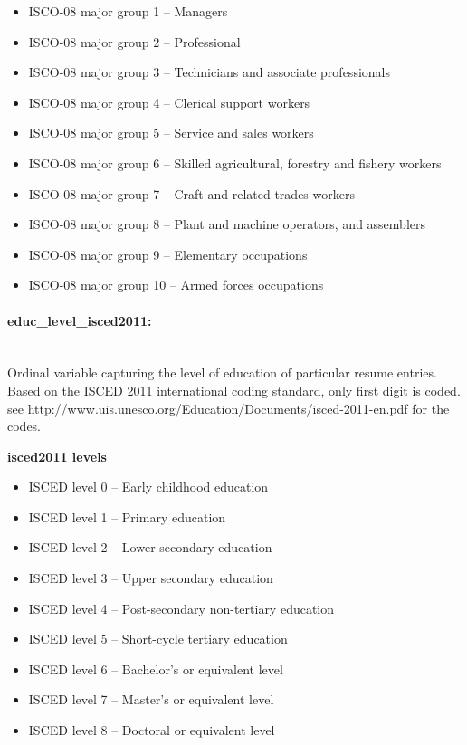 \documentclass{article}
\begin{document}
        \begin{itemize}
    \setlength\itemsep{0em}
        \item ISCO-08 major group 1 – Managers
        \item ISCO-08 major group 2 – Professional
        \item ISCO-08 major group 3 – Technicians and associate professionals
        \item ISCO-08 major group 4 – Clerical support workers
        \item ISCO-08 major group 5 – Service and sales workers
        \item ISCO-08 major group 6 – Skilled agricultural, forestry and fishery workers
        \item ISCO-08 major group 7 – Craft and related trades workers
        \item ISCO-08 major group 8 – Plant and machine operators, and assemblers
        \item ISCO-08 major group 9 – Elementary occupations
        \item ISCO-08 major group 10 – Armed forces occupations
    \end{itemize}

\paragraph{educ\_level\_isced2011:}\\
    Ordinal variable capturing the level of education of particular resume entries. Based on the ISCED 2011 international coding standard, only first digit is coded. see \url{http://www.uis.unesco.org/Education/Documents/isced-2011-en.pdf} for the codes. \par
    \textbf{isced2011 levels}
    \begin{itemize}
    \setlength\itemsep{0em}
        \item ISCED level 0 – Early childhood education
        \item ISCED level 1 – Primary education
        \item ISCED level 2 – Lower secondary education
        \item ISCED level 3 – Upper secondary education
        \item ISCED level 4 – Post-secondary non-tertiary education
        \item ISCED level 5 – Short-cycle tertiary education
        \item ISCED level 6 – Bachelor’s or equivalent level
        \item ISCED level 7 – Master’s or equivalent level
        \item ISCED level 8 – Doctoral or equivalent level
    \end{itemize}
\end{document}
